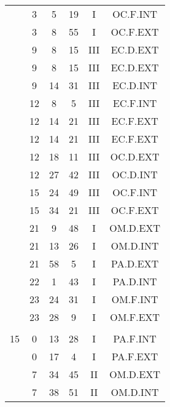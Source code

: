 \documentclass[12pt, a4paper]{article}
\begin{document}
\begin{multicols}{3}
{\begin{tabular}{c c c c c c}
	 	 	 	 & 3 & 5 & 19 & I & OC.F.INT\\%
	 	 	 	 & 3 & 8 & 55 & I & OC.F.EXT\\%
	 	 	 	 & 9 & 8 & 15 & III & EC.D.EXT\\%
	 	 	 	 & 9 & 8 & 15 & III & EC.D.EXT\\%
	 	 	 	 & 9 & 14 & 31 & III & EC.D.INT\\%
	 	 	 	 & 12 & 8 & 5 & III & EC.F.INT\\%
	 	 	 	 & 12 & 14 & 21 & III & EC.F.EXT\\%
	 	 	 	 & 12 & 14 & 21 & III & EC.F.EXT\\%
	 	 	 	 & 12 & 18 & 11 & III & OC.D.EXT\\%
	 	 	 	 & 12 & 27 & 42 & III & OC.D.INT\\%
	 	 	 	 & 15 & 24 & 49 & III & OC.F.INT\\%
	 	 	 	 & 15 & 34 & 21 & III & OC.F.EXT\\%
	 	 	 	 & 21 & 9 & 48 & I & OM.D.EXT\\%
	 	 	 	 & 21 & 13 & 26 & I & OM.D.INT\\%
	 	 	 	 & 21 & 58 & 5 & I & PA.D.EXT\\%
	 	 	 	 & 22 & 1 & 43 & I & PA.D.INT\\%
	 	 	 	 & 23 & 24 & 31 & I & OM.F.INT\\%
	 	 	 	 & 23 & 28 & 9 & I & OM.F.EXT\\%
	 	 	 	 & & & & & \\%
	 	 	 	15 & 0 & 13 & 28 & I & PA.F.INT\\%
	 	 	 	 & 0 & 17 & 4 & I & PA.F.EXT\\%
	 	 	 	 & 7 & 34 & 45 & II & OM.D.EXT\\%
	 	 	 	 & 7 & 38 & 51 & II & OM.D.INT\\%

\end{tabular}}
\end{multicols}
\end{document}
